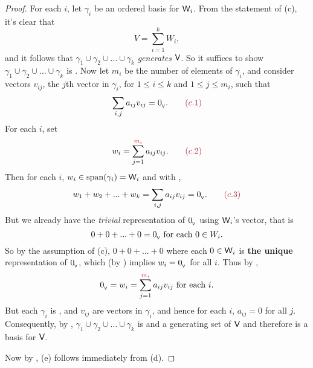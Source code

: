 \begin{proof}
For each \(i\), let \(\gamma_i\) be an ordered basis for \(\textsf{W}_i\).
From the statement of (c), it's clear that
\[
    V = \sum_{i = 1}^k W_i,
\]
and it follows that \(\gamma_1 \cup \gamma_2 \cup ... \cup \gamma_k\) \emph{generates} \(\textsf{V}\).
So it suffices to show \(\gamma_1 \cup \gamma_2 \cup ... \cup \gamma_k\) is \LID{}.
Now let \(m_i\) be the number of elements of \(\gamma_i\), and consider vectors \(v_{ij}\), the \(j\)th vector in \(\gamma_i\), for \(1 \le i \le k\) and \(1 \le j \le m_i\), such that
\[
    \sum_{i, j} a_{ij} v_{ij} = \OV. \quad \quad \MAROON{(c.1)}
\]
For each \(i\), set
\[
    w_i = \sum_{j = 1}^{\RED{m_i}} a_{ij} v_{ij}. \quad \quad \MAROON{(c.2)}
\]
Then for each \(i\), \(w_i \in \operatorname{span}(\gamma_i) = \textsf{W}_i\) and with ,
\[
    w_1 + w_2 + ... + w_k = \sum_{i, j} a_{ij} v_{ij} = \OV. \quad \quad \MAROON{(c.3)}
\]
But we already have the \emph{trivial} representation of \(0_{_{\textsf{V}}}\) using \(\textsf{W}_i\)'s vector, that is
\[
    0 + 0 + ... + 0 = 0_{_{\textsf{V}}} \text{ for each } 0 \in W_i.
\]
So by the assumption of (c), \(0 + 0 + ... + 0\) where each \(0 \in \textsf{W}_i\) is \textbf{the unique} representation of \(0_{_{\textsf{V}}}\), which (by ) implies \(w_i = 0_{_{\textsf{V}}}\) for all \(i\).
Thus by ,
\[
    \OV = w_i = \sum_{j = 1}^{\RED{m_i}} a_{ij} v_{ij} \text{ for each } i.
\]
But each \(\gamma_i\) is \LID{}, and \(v_{ij}\) are vectors in \(\gamma_i\), and hence for each \(i\), \(a_{ij} = 0\) for all \(j\).
Consequently, by , \(\gamma_1 \cup \gamma_2 \cup ... \cup \gamma_k\) is \LID{} and a generating set of \(\textsf{V}\) and therefore is a basis for \(\textsf{V}\).

Now by , (e) follows immediately from (d).


\end{proof}
